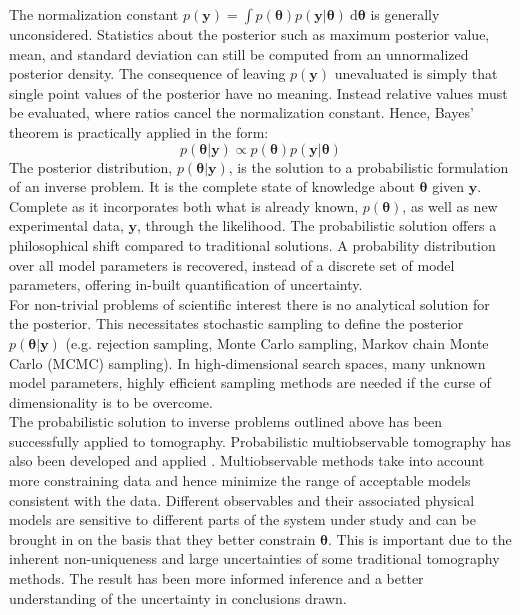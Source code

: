 The normalization constant $p(\bm{y}) = \int p(\bm{\theta}) p(\bm{y}|\bm{\theta})\ \text{d}\bm{\theta}$ is generally unconsidered. Statistics about the posterior such as maximum posterior value, mean, and standard deviation can still be computed from an unnormalized posterior density. The consequence of leaving $p(\bm{y})$ unevaluated is simply that single point values of the posterior have no meaning. Instead relative values must be evaluated, where ratios cancel the normalization constant. Hence, Bayes' theorem is practically applied in the form:
\begin{equation}
p(\bm{\theta}|\bm{y}) \propto p(\bm{\theta}) p(\bm{y}|\bm{\theta})
\label{applied_bayes}	
\end{equation}
The posterior distribution, $p(\bm{\theta}|\bm{y})$, is the solution to a probabilistic formulation of an inverse problem. It is the complete state of knowledge about $\bm{\theta}$ given $\bm{y}$. Complete as it incorporates both what is already known, $p(\bm{\theta})$, as well as new experimental data, $\bm{y}$, through the likelihood. The probabilistic solution offers a philosophical shift compared to traditional solutions. A probability distribution over all model parameters is recovered, instead of a discrete set of model parameters, offering in-built quantification of uncertainty. \\

For non-trivial problems of scientific interest there is no analytical solution for the posterior. This necessitates stochastic sampling to define the posterior $p(\bm{\theta}|\bm{y})$ (e.g. rejection sampling, Monte Carlo sampling, Markov chain Monte Carlo (MCMC) sampling). In high-dimensional search spaces, many unknown model parameters, highly efficient sampling methods are needed if the curse of dimensionality is to be overcome.\\

The probabilistic solution to inverse problems outlined above has been successfully applied to tomography. Probabilistic multiobservable tomography has also been developed  and applied \citep{khan2007joint,afonso2013a,afonso2013b,afonso2016}. Multiobservable methods take into account more constraining data and hence minimize the range of acceptable models consistent with the data. Different observables and their associated physical models are sensitive to different parts of the system under study and can be brought in on the basis that they better constrain $\bm{\theta}$. This is important due to the inherent non-uniqueness and large uncertainties of some traditional tomography methods. The result has been more informed inference and a better understanding of the uncertainty in conclusions drawn.\\

